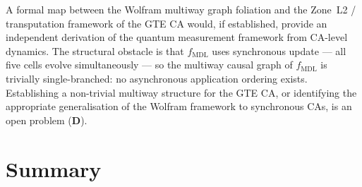 \documentclass[11pt]{article}
\theoremstyle{remark}
\newcommand{\MDL}{\text{MDL}}
\newcommand{\CatD}{\textbf{D}}
\begin{document}
A formal map between the Wolfram multiway graph foliation and the
Zone~L2 / transputation framework of the GTE CA would, if established,
provide an independent derivation of the quantum measurement framework
from CA-level dynamics.
The structural obstacle is that $f_{\MDL}$ uses synchronous
update --- all five cells evolve simultaneously --- so the multiway
causal graph of $f_{\MDL}$ is trivially single-branched: no
asynchronous application ordering exists.
Establishing a non-trivial multiway structure for the GTE CA, or
identifying the appropriate generalisation of the Wolfram framework
to synchronous CAs, is an open problem (\CatD{}).

\section*{Summary}
\label{sec:summary}
\end{document}
